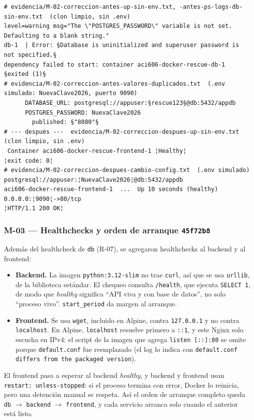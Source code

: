 \documentclass[11pt,a4paper]{article}
\newcommand{\cod}[1]{\texttt{#1}}
\begin{document}
\begin{lstlisting}
# evidencia/M-02-correccion-antes-up-sin-env.txt, -antes-ps-logs-db-sin-env.txt  (clon limpio, sin .env)
level=warning msg="The \"POSTGRES_PASSWORD\" variable is not set. Defaulting to a blank string."
db-1  | Error: §Database is uninitialized and superuser password is not specified.§
dependency failed to start: container aci606-docker-rescue-db-1 §exited (1)§
# evidencia/M-02-correccion-antes-valores-duplicados.txt  (.env simulado: NuevaClave2026, puerto 9090)
      DATABASE_URL: postgresql://appuser:§rescue123§@db:5432/appdb
      POSTGRES_PASSWORD: NuevaClave2026
        published: §"8080"§
# --- después ---  evidencia/M-02-correccion-despues-up-sin-env.txt  (clon limpio, sin .env)
 Container aci606-docker-rescue-frontend-1 ¦Healthy¦
¦exit code: 0¦
# evidencia/M-02-correccion-despues-cambio-config.txt  (.env simulado)
postgresql://appuser:¦NuevaClave2026¦@db:5432/appdb
aci606-docker-rescue-frontend-1  ...  Up 10 seconds (healthy)   0.0.0.0:¦9090¦->80/tcp
¦HTTP/1.1 200 OK¦
\end{lstlisting}

\subsubsection*{M-03 — Healthchecks y orden de arranque \hfill{\normalfont\small\cod{45f72b8}}}

Además del healthcheck de \cod{db} (R-07), se agregaron healthchecks al backend y al frontend:

\begin{itemize}
  \item \textbf{Backend.} La imagen \cod{python:3.12-slim} no trae \cod{curl}, así que se usa \cod{urllib}, de la biblioteca estándar. El chequeo consulta \cod{/health}, que ejecuta \cod{SELECT 1}, de modo que \emph{healthy} significa \enquote{API viva y con base de datos}, no solo \enquote{proceso vivo}. \cod{start\_period} da margen al arranque.
  \item \textbf{Frontend.} Se usa \cod{wget}, incluido en Alpine, contra \cod{127.0.0.1} y no contra \cod{localhost}. En Alpine, \cod{localhost} resuelve primero a \cod{::1}, y este Nginx solo escucha en IPv4: el script de la imagen que agrega \cod{listen [::]:80} se omite porque \cod{default.conf} fue reemplazado (el log lo indica con \cod{default.conf differs from the packaged version}).
\end{itemize}

El frontend pasa a esperar al backend \emph{healthy}, y backend y frontend usan \cod{restart: unless-stopped}: si el proceso termina con error, Docker lo reinicia, pero una detención manual se respeta. Así el orden de arranque completo queda \cod{db} $\to$ \cod{backend} $\to$ \cod{frontend}, y cada servicio arranca solo cuando el anterior está listo.
\end{document}
